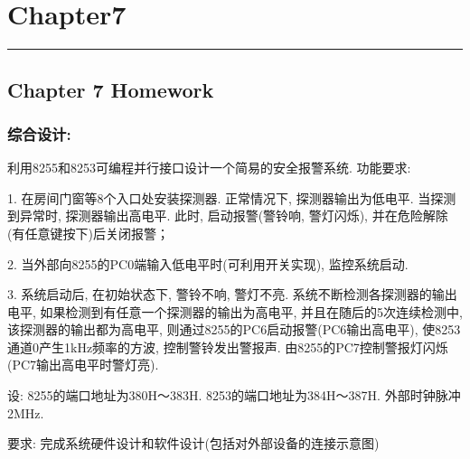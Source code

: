 \section{Chapter7}
\vspace{-15pt}\noindent\rule{\textwidth}{0.1pt}\vspace{-10pt}
    \subsection*{Chapter 7 Homework}
    \subsubsection{\textnormal{综合设计:}}

    利用8255和8253可编程并行接口设计一个简易的安全报警系统. 功能要求: 

    1. 在房间门窗等8个入口处安装探测器. 正常情况下, 探测器输出为低电平. 当探测到异常时, 探测器输出高电平. 此时, 启动报警(警铃响, 警灯闪烁), 并在危险解除(有任意键按下)后关闭报警；

    2. 当外部向8255的PC0端输入低电平时(可利用开关实现), 监控系统启动. 

    3. 系统启动后, 在初始状态下, 警铃不响, 警灯不亮. 系统不断检测各探测器的输出电平, 如果检测到有任意一个探测器的输出为高电平, 并且在随后的5次连续检测中, 该探测器的输出都为高电平, 则通过8255的PC6启动报警(PC6输出高电平), 使8253通道0产生1kHz频率的方波, 控制警铃发出警报声. 由8255的PC7控制警报灯闪烁(PC7输出高电平时警灯亮). 

设: 8255的端口地址为380H～383H. 8253的端口地址为384H～387H. 外部时钟脉冲2MHz. 

要求: 完成系统硬件设计和软件设计(包括对外部设备的连接示意图)

    